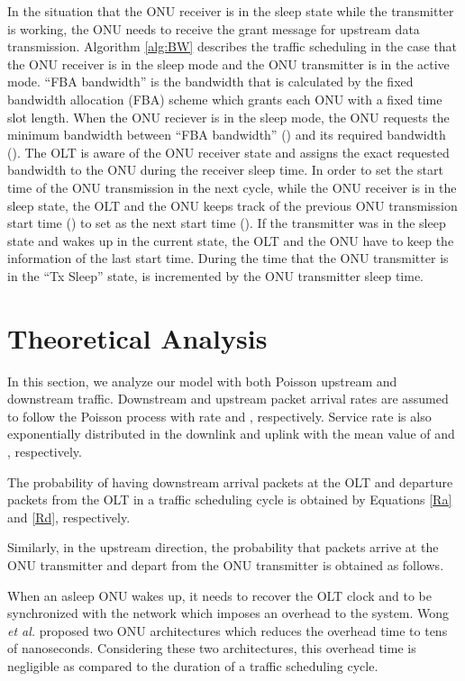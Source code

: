 \documentclass[11pt,english,12pt,onecolumn, draftcls]{IEEEtran}
\theoremstyle{plain}
\theoremstyle{definition}
\begin{document}
In the situation that the ONU receiver is in the sleep state while the transmitter is working, the ONU needs to receive the grant message for upstream data transmission. Algorithm \ref{alg:BW} describes the traffic scheduling in the case that the ONU receiver is in the sleep mode and the ONU transmitter is in the active mode. ``FBA bandwidth'' is the bandwidth that is calculated by the fixed bandwidth allocation (FBA) scheme which grants each ONU with a fixed time slot length. When the ONU reciever is in the sleep mode, the ONU requests the minimum bandwidth between ``FBA bandwidth'' () and its required bandwidth (). The OLT is aware of the ONU receiver state and assigns the exact requested bandwidth to the ONU during the receiver sleep time. In order to set the start time of the ONU transmission in the next cycle, while the ONU receiver is in the sleep state, the OLT and the ONU keeps track of the previous ONU transmission start time () to set  as the next start time (). If the transmitter was in the sleep state and wakes up in the current state, the OLT and the ONU have to keep the information of the last start time. During the time that the ONU transmitter is in the ``Tx Sleep'' state,  is incremented by the ONU transmitter sleep time.

\section{Theoretical Analysis}
\label{sec:Ana}
In this section, we analyze our model with both Poisson upstream and downstream traffic. Downstream and upstream packet arrival rates are assumed to follow the Poisson process with rate  and , respectively. Service rate is also exponentially distributed in the downlink and uplink with the mean value of  and , respectively.

The probability of having  downstream arrival packets at the OLT and departure packets from the OLT in a traffic scheduling cycle is obtained by Equations \ref{Ra} and \ref{Rd}, respectively.





Similarly, in the upstream direction, the probability that  packets arrive at the ONU transmitter and depart from the ONU transmitter is obtained as follows.





When an asleep ONU wakes up, it needs to recover the OLT clock and to be synchronized with the network which imposes an overhead to the system. Wong \emph{et al.} \cite{Wongslp09} proposed two ONU architectures which reduces the overhead time to tens of nanoseconds. Considering these two architectures, this overhead time is negligible as compared to the duration of a traffic scheduling cycle.
\end{document}
